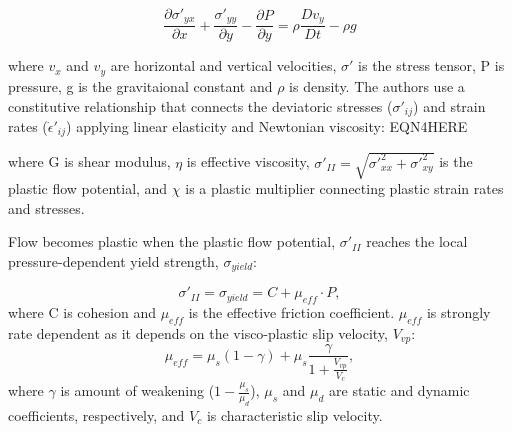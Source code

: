 \documentclass[draft,jgrga]{agutex}
\begin{document}
\begin{article}
\begin{equation}
	\frac{\partial \sigma'_{yx}}{\partial x} + \frac{\sigma'_{yy}}{\partial y} - \frac{\partial P}{\partial y} = \rho\frac{Dv_y}{Dt} - \rho g
	\label{eqn:momentum}
\end{equation}
	
where $v_x$ and $v_y$ are horizontal and vertical velocities, $\sigma'$ is the stress tensor, P is pressure, g is the gravitaional constant and $\rho$ is density. The authors use a constitutive relationship that connects the deviatoric stresses ($\sigma'_{ij}$) and strain rates ($\dot{\epsilon}'_{ij}$) applying linear elasticity and Newtonian viscosity: EQN4HERE

	
where G is shear modulus, $\eta$ is effective viscosity, $\sigma'_{II} = \sqrt{\sigma'^2_{xx} + \sigma'^2_{xy}}$ is the plastic flow potential, and $\chi$ is a plastic multiplier connecting plastic strain rates and stresses.

Flow becomes plastic when the plastic flow potential, $\sigma'_{II}$ reaches the local pressure-dependent yield strength, $\sigma_{yield}$:

\begin{equation}
	 	\sigma'_{II} = \sigma_{yield} = C + \mu_{eff} \cdot P, 
 \end{equation} 
where C is cohesion and $\mu_{eff}$ is the effective friction coefficient. $\mu_{eff}$ is strongly rate dependent as it depends on the visco-plastic slip velocity, $V_{vp}$:
\begin{equation}
 	\mu_{eff} = \mu_s(1-\gamma) + \mu_s\frac{\gamma}{1 + \frac{V_{vp}}{V_c}},
 \end{equation} 
 where  $\gamma$ is amount of weakening ($1 - \frac{\mu_s}{\mu_d}$), $\mu_s$ and $\mu_d$ are static and dynamic coefficients, respectively, and $V_c$ is characteristic slip velocity. 


\end{article}
\end{document}
